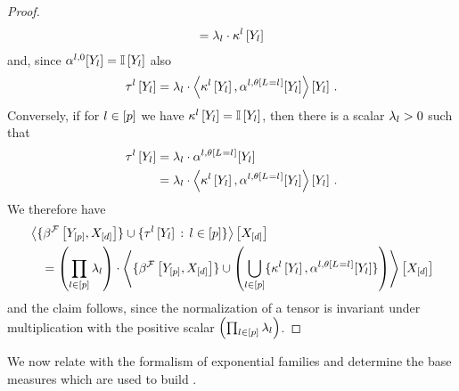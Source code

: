 \begin{proof}
\begin{align*}
        = \lambda_{l} \cdot \kappa^{l}\left[Y_{l}\right]
    \end{align*}
    and, since $\alpha^{l,0}[Y_{l}] = \mathbb{I}\left[Y_{l}\right]$ also
    \begin{align*}
        \tau^{l}\left[Y_{l}\right]
        = \lambda_{l} \cdot \left\langle \kappa^{l}\left[Y_{l}\right],\alpha^{l,\theta\left[L_{}=l_{}\right]}[Y_{l}]\right\rangle \left[ Y_{l} \right] \, .
    \end{align*}
    Conversely, if for $l\in[p]$ we have $\kappa^{l}\left[Y_{l}\right]=\mathbb{I}\left[Y_{l}\right]$, then there is a scalar $\lambda_{l}>0$ such that
    \begin{align*}
        \tau^{l}\left[Y_{l}\right]
        &= \lambda_{l} \cdot \alpha^{l,\theta\left[L_{}=l_{}\right]}[Y_{l}] \\
        &= \lambda_{l} \cdot \left\langle \kappa^{l}\left[Y_{l}\right],\alpha^{l,\theta\left[L_{}=l_{}\right]}[Y_{l}]\right\rangle \left[ Y_{l} \right] \, . \\
    \end{align*}
    We therefore have
    \begin{align*}
        &\left\langle 
            \{\beta^{\mathcal{F}}\left[Y_{[p]},X_{[d]}\right]\}
            \cup \{\tau^{l}\left[Y_{l}\right]\,:\,l\in[p]\}
        \right\rangle \left[ X_{[d]} \right]\\
        &\quad =\left(\prod_{l\in[p]}\lambda_{l}\right)\cdot\left\langle 
            \{\beta^{\mathcal{F}}\left[Y_{[p]},X_{[d]}\right]\}
            \cup \left(\bigcup_{l\in[p]}\{\kappa^{l}\left[Y_{l}\right],\alpha^{l,\theta\left[L_{}=l_{}\right]}[Y_{l}]\}\right)
        \right\rangle \left[ X_{[d]} \right]
    \end{align*}
    and the claim follows, since the normalization of a tensor is invariant under multiplication with the positive scalar $\left(\prod_{l\in[p]}\lambda_{l}\right)$.
\end{proof}

We now relate with the formalism of exponential families and determine the base measures which are used to build \HybridLogicNetworks{}.


